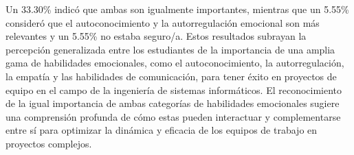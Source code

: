\documentclass[journal]{IEEEtran}
\begin{document}
\begin{enumerate}
{Un 33.30\% indicó que ambas son igualmente importantes, mientras que un 5.55\% consideró que el autoconocimiento y la autorregulación emocional son más relevantes y un 5.55\% no estaba seguro/a.
Estos resultados subrayan la percepción generalizada entre los estudiantes de la importancia de una amplia gama de habilidades emocionales, como el autoconocimiento, la autorregulación, la empatía y las habilidades de comunicación, para tener éxito en proyectos de equipo en el campo de la ingeniería de sistemas informáticos.
El reconocimiento de la igual importancia de ambas categorías de habilidades emocionales sugiere una comprensión profunda de cómo estas pueden interactuar y complementarse entre sí para optimizar la dinámica y eficacia de los equipos de trabajo en proyectos complejos.
}\\


\end{enumerate}
\end{document}
